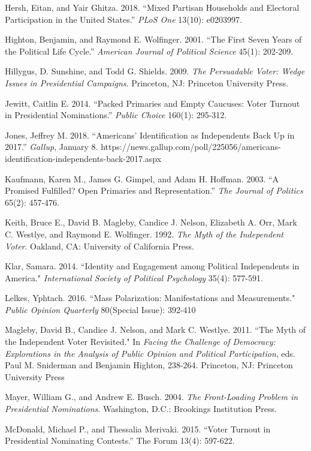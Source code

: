 \documentclass[12pt]{article}
\begin{document}
\begin{doublespace}
\begin{hangparas}{.25in}{1}
			Hersh, Eitan, and Yair Ghitza. 2018. “Mixed Partisan Households and Electoral Participation in the United States.” \textit{PLoS One} 13(10): e0203997.
			
			Highton, Benjamin, and Raymond E. Wolfinger. 2001. “The First Seven Years of the Political Life Cycle.”\textit{ American Journal of Political Science} 45(1): 202-209.
			
			Hillygus, D. Sunshine, and Todd G. Shields. 2009. \textit{The Persuadable Voter: Wedge Issues in Presidential Campaigns}. Princeton, NJ: Princeton University Press. 
			
			Jewitt, Caitlin E. 2014. “Packed Primaries and Empty Caucuses: Voter Turnout in Presidential Nominations.” \textit{Public Choice} 160(1): 295-312.
			
			Jones, Jeffrey M. 2018. “Americans' Identification as Independents Back Up in 2017.” \textit{Gallup}, January 8. https://news.gallup.com/poll/225056/americans-identification-independents-back-2017.aspx
			
			Kaufmann, Karen M., James G. Gimpel, and Adam H. Hoffman. 2003. “A Promised Fulfilled? Open Primaries and Representation.” \textit{The Journal of Politics} 65(2): 457-476.
			
			Keith, Bruce E., David B. Magleby, Candice J. Nelson, Elizabeth A. Orr, Mark C. Westlye, and Raymond E. Wolfinger. 1992. \textit{The Myth of the Independent Voter}. Oakland, CA: University of California Press.
			
			Klar, Samara. 2014. ``Identity and Engagement among Political Independents in America." \textit{International Society of Political Psychology} 35(4): 577-591.
			
			Lelkes, Yphtach. 2016. ``Mass Polarization: Manifestations and Measurements." \textit{Public Opinion Quarterly} 80(Special Issue): 392-410
		
			Magleby, David B., Candice J. Nelson, and Mark C. Westlye. 2011. ``The Myth of the Independent Voter Revisited." In \textit{Facing the Challenge of Democracy: Explorations in the Analysis of Public Opinion and Political Participation}, eds. Paul M. Sniderman and Benjamin Highton, 238-264. Princeton, NJ: Princeton University Press
		
			Mayer, William G., and Andrew E. Busch. 2004. \textit{The Front-Loading Problem in Presidential Nominations}. Washington, D.C.: Brookings Institution Press. 	
		
			McDonald, Michael P., and Thessalia Merivaki. 2015. “Voter Turnout in Presidential Nominating Contests.” The Forum 13(4): 597-622.
			

\end{hangparas}
\end{doublespace}
\end{document}
